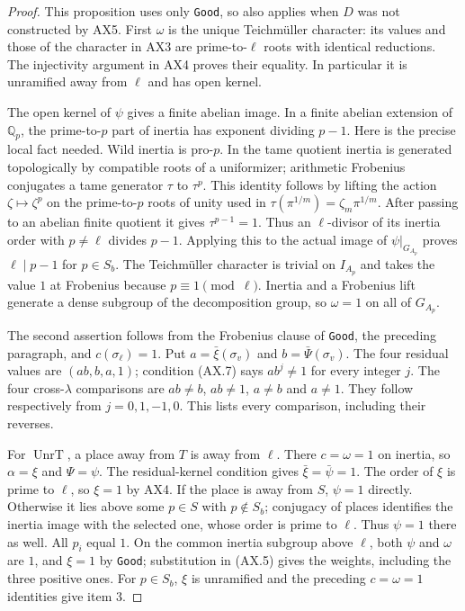 \begin{proof}
This proposition uses only \texttt{Good}, so also applies when
$D$ was not constructed by AX5.  First $\omega$ is the unique
Teichm\"uller character: its values and those of the character
in AX3 are prime-to-$\ell$ roots with identical reductions.
The injectivity argument in AX4 proves their equality.  In
particular it is unramified away from $\ell$ and has open kernel.

The open kernel of $\psi$ gives a finite abelian image.  In a
finite abelian extension of $\mathbb Q_p$, the prime-to-$p$ part
of inertia has exponent dividing $p-1$.  Here is the precise local
fact needed.  Wild inertia is pro-$p$.  In the tame quotient inertia
is generated topologically by compatible roots of a uniformizer;
arithmetic Frobenius conjugates a tame generator $\tau$ to
$\tau^p$.  This identity follows by lifting the action
$\zeta\mapsto\zeta^p$ on the prime-to-$p$ roots of unity used in
$\tau(\pi^{1/m})=\zeta_m\pi^{1/m}$.  After passing to an abelian
finite quotient it gives $\tau^{p-1}=1$.  Thus an $\ell$-divisor
of its inertia order with $p\ne\ell$ divides $p-1$.
Applying this to the actual image of $\psi|_{G_{A_p}}$ proves
$\ell\mid p-1$ for $p\in S_b$.
The Teichm\"uller character is trivial on $I_{A_p}$ and takes
the value $1$ at Frobenius because $p\equiv1\pmod\ell$.
Inertia and a Frobenius lift generate a dense subgroup of the
decomposition group, so $\omega=1$ on all of $G_{A_p}$.

The second assertion follows from the Frobenius clause of
\texttt{Good}, the preceding paragraph, and $c(\sigma_\ell)=1$.
Put $a=\bar\xi(\sigma_v)$ and $b=\bar\Psi(\sigma_v)$.
The four residual values are $(ab,b,a,1)$; condition (AX.7) says
$ab^j\ne1$ for every integer $j$.  The four cross-$\lambda$
comparisons are $ab\ne b$, $ab\ne1$, $a\ne b$ and $a\ne1$.
They follow respectively from $j=0,1,-1,0$.  This lists every
comparison, including their reverses.

For $\operatorname{UnrT}$, a place away from $T$ is away from
$\ell$.  There $c=\omega=1$ on inertia, so
$\alpha=\xi$ and $\Psi=\psi$.  The residual-kernel condition
gives $\bar\xi=\bar\psi=1$.  The order of $\xi$ is prime to
$\ell$, so $\xi=1$ by AX4.  If the place is away from $S$,
$\psi=1$ directly.  Otherwise it lies above some $p\in S$
with $p\notin S_b$; conjugacy of places identifies the inertia
image with the selected one, whose order is prime to $\ell$.
Thus $\psi=1$ there as well.  All $p_i$ equal $1$.
On the common inertia subgroup above $\ell$, both $\psi$ and
$\omega$ are $1$, and $\xi=1$ by \texttt{Good}; substitution in
(AX.5) gives the weights, including the three positive ones.
For $p\in S_b$, $\xi$ is unramified and the preceding
$c=\omega=1$ identities give item 3.


\end{proof}
